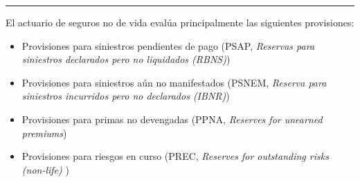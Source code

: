 \hrule

\begin{f}[Provisión]
	
	El actuario de seguros no de vida evalúa principalmente las 
	siguientes provisiones:
	\begin{itemize}
		\item Provisiones para siniestros pendientes de pago (PSAP, \emph{Reservas para siniestros declarados pero no liquidados (RBNS)}) 
		\item Provisiones para siniestros aún no manifestados (PSNEM, \emph{Reserva para siniestros incurridos pero no declarados (IBNR)})
		\item Provisiones para primas no devengadas (PPNA, \emph{Reserves for unearned premiums})
		\item Provisiones para riesgos en curso (PREC,  \emph{Reserves for outstanding risks (non-life)}
		)
	\end{itemize}
	
\end{f}




